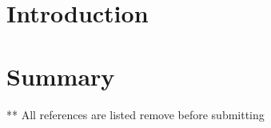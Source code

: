 \documentclass{master_thesis}
\begin{document}

\section{Introduction}





\section{Summary}

\pagebreak
** All references are listed remove before submitting
\printbibliography{}
\end{document}
